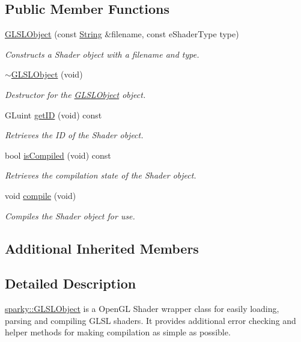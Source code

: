 \subsection*{Public Member Functions}
\begin{DoxyCompactItemize}
\item 
\hyperlink{classsparky_1_1_g_l_s_l_object_a85a8c97e161d81fd961324fda2372751}{G\+L\+S\+L\+Object} (const \hyperlink{classsparky_1_1_string}{String} \&filename, const e\+Shader\+Type type)
\begin{DoxyCompactList}\small\item\em Constructs a Shader object with a filename and type. \end{DoxyCompactList}\item 
\hyperlink{classsparky_1_1_g_l_s_l_object_a777c86a4cf5913159cfc494d37a336ea}{$\sim$\+G\+L\+S\+L\+Object} (void)
\begin{DoxyCompactList}\small\item\em Destructor for the \hyperlink{classsparky_1_1_g_l_s_l_object}{G\+L\+S\+L\+Object} object. \end{DoxyCompactList}\item 
G\+Luint \hyperlink{classsparky_1_1_g_l_s_l_object_a0a7d1f61fb10079b3404ed862607796e}{get\+ID} (void) const 
\begin{DoxyCompactList}\small\item\em Retrieves the ID of the Shader object. \end{DoxyCompactList}\item 
bool \hyperlink{classsparky_1_1_g_l_s_l_object_aab666d4c1277d07fea3045b10ba3d777}{is\+Compiled} (void) const 
\begin{DoxyCompactList}\small\item\em Retrieves the compilation state of the Shader object. \end{DoxyCompactList}\item 
void \hyperlink{classsparky_1_1_g_l_s_l_object_a85334b1ae8d24d3aaee8cd39397c944b}{compile} (void)
\begin{DoxyCompactList}\small\item\em Compiles the Shader object for use. \end{DoxyCompactList}\end{DoxyCompactItemize}
\subsection*{Additional Inherited Members}


\subsection{Detailed Description}
\hyperlink{classsparky_1_1_g_l_s_l_object}{sparky\+::\+G\+L\+S\+L\+Object} is a Open\+GL Shader wrapper class for easily loading, parsing and compiling G\+L\+SL shaders. It provides additional error checking and helper methods for making compilation as simple as possible.


